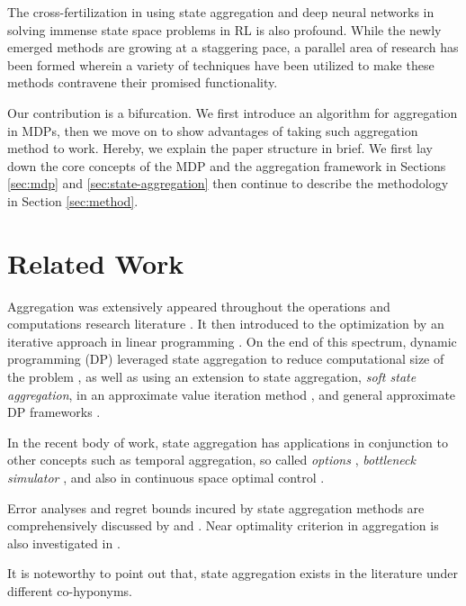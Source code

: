 \documentclass{article}
\begin{document}
    The cross-fertilization in using state aggregation and deep neural networks in solving immense state
    space problems in RL is also profound.
    While the newly emerged methods are growing at a staggering pace, a parallel area of research has been formed
    wherein a variety of techniques have been utilized to make these methods contravene their promised functionality.

    Our contribution is a bifurcation.
    We first introduce an algorithm for aggregation in MDPs, then we move on to show advantages of taking such
    aggregation method to work.
    Hereby, we explain the paper structure in brief.
    We first lay down the core concepts of the MDP and the aggregation framework in Sections \ref{sec:mdp} and
    \ref{sec:state-aggregation} then continue to describe the methodology in Section \ref{sec:method}.


\section{Related Work}
    \label{sec:related-work}
    Aggregation was extensively appeared throughout the operations and computations research literature
    \cite{Chatelin1982, Rogers1991, Douglas1993}.
    It then introduced to the optimization by an iterative approach in linear programming \cite{Mendelssohn1982}.
    On the end of this spectrum, dynamic programming (DP) leveraged state aggregation to reduce computational size of
    the problem \cite{Bean1987}, as well as using an extension to state aggregation, \textit{soft state
    aggregation}, in an approximate value iteration method \cite{Singh1995}, and general approximate DP frameworks
    \cite{Gordon1995, Tsitsiklis1996}.

    In the recent body of work, state aggregation has applications in conjunction to other concepts such as
    temporal aggregation, so called \textit{options} \cite{Ciosek2015}, \textit{bottleneck simulator}
    \cite{Serban2018}, and also in continuous space optimal control \cite{Zhong2011}.

    Error analyses and regret bounds incured by state aggregation methods are comprehensively discussed by
    \citet{VanRoy2006} and \citet{Petrik2014}.
    Near optimality criterion in aggregation is also investigated in \citet{Bernstein2008}.

    It is noteworthy to point out that, state aggregation exists in the literature under different co-hyponyms.
    
\end{document}
